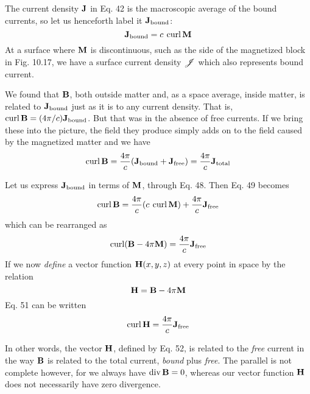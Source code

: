 The current density $\mathbf{J}$ in Eq. 42 is the macroscopic average of the
bound currents, so let us henceforth label it $\mathbf{J}_\text{bound}$:
\begin{equation}
  \mathbf{J}_\text{bound} = c\:\operatorname{curl}\mathbf{M}
\end{equation}
At a surface where $\mathbf{M}$ is discontinuous, such as the side of the magnetized
block in Fig. 10.17, we have a surface current density $\mathscr{J}$ which
also represents bound current.

We found that $\mathbf{B}$, both outside matter and, as a space average,
inside matter, is related to $\mathbf{J}_\text{bound}$ just as it is to any current density.
That is, $\operatorname{curl}\mathbf{B} = (4\pi/c)\mathbf{J}_\text{bound}$. But that was in the absence of free
currents. If we bring these into the picture, the field they produce
simply adds on to the field caused by the magnetized matter and
we have
\begin{equation}
  \operatorname{curl}\mathbf{B} = \frac{4\pi}{c}(\mathbf{J}_\text{bound}+\mathbf{J}_\text{free}) = \frac{4\pi}{c}\mathbf{J}_\text{total}
\end{equation}

Let us express $\mathbf{J}_\text{bound}$ in terms of $\mathbf{M}$, through Eq. 48. Then Eq. 49
becomes
\begin{equation}
  \operatorname{curl}\mathbf{B} = \frac{4\pi}{c}(c\:\operatorname{curl}\mathbf{M}) + \frac{4\pi}{c}\mathbf{J}_\text{free}
\end{equation}
which can be rearranged as
\begin{equation}
  \operatorname{curl}(\mathbf{B}-4\pi\mathbf{M}) = \frac{4\pi}{c}\mathbf{J}_\text{free}
\end{equation}
If we now \emph{define} a vector function $\mathbf{H}(x,y,z)$ at every point in space
by the relation
\begin{equation}
  \mathbf{H} = \mathbf{B}-4\pi\mathbf{M}
\end{equation}
Eq. 51 can be written
\begin{equation}
  \operatorname{curl}\mathbf{H} = \frac{4\pi}{c}\mathbf{J}_\text{free}
\end{equation}

In other words, the vector $\mathbf{H}$, defined by Eq. 52, is related to the
\emph{free} current in the way $\mathbf{B}$ is related to the total current, \emph{bound} plus
\emph{free}. The parallel is not complete however, for we always have
$\operatorname{div}\mathbf{B} = 0$, whereas our vector function $\mathbf{H}$ does not necessarily have
zero divergence.

